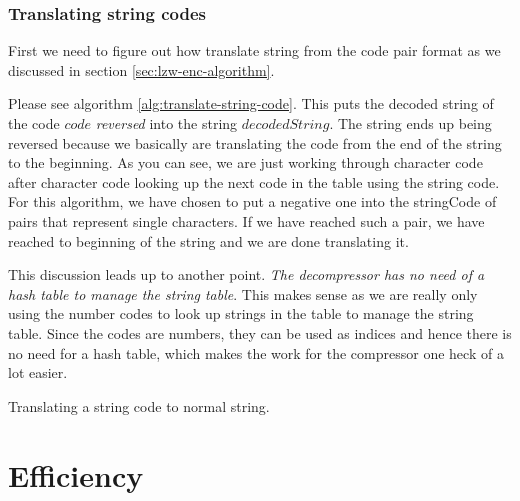 \begin{refsection}
\begin{algorithm}[H]
\begin{algorithmic}[1]

    \EndWhile
  \end{algorithmic}
\end{algorithm}

\subsubsection{Translating string codes}

First we need to figure out how translate string from the code pair format as we
discussed in section \ref{sec:lzw-enc-algorithm}.

Please see algorithm \ref{alg:translate-string-code}. This puts the
decoded string of the code $code$ \textit{reversed} into the string
$decodedString$. The string ends up being reversed because we
basically are translating the code from the end of the string to the
beginning. As you can see, we are just working through character code
after character code looking up the next code in the table using the
string code. For this algorithm, we have chosen to put a negative one
into the stringCode of pairs that represent single characters. If we
have reached such a pair, we have reached to beginning of the string
and we are done translating it.

This discussion leads up to another point. \textit{The decompressor
  has no need of a hash table to manage the string table}. This makes sense as
we are really only using the number codes to look up strings in the
table to manage the string table. Since the codes are numbers, they
can be used as indices and hence there is no need for a hash table,
which makes the work for the compressor one heck of a lot easier.

\begin{algorithm}[H]
  \caption{Translating a string code to normal string.}
  \label{alg:translate-string-code}
  \begin{algorithmic}[1]
    \While{\True}

        \Break
      \Else
      \EndIf
    \EndWhile
  \end{algorithmic}
\end{algorithm}

\section{Efficiency}


\end{refsection}
